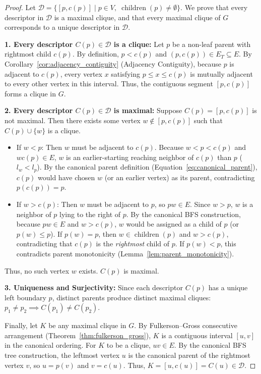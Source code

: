\begin{proof}
Let $\mathcal{D} = \{ [p, c(p)] \mid p \in V, \; \operatorname{children}(p) \ne \emptyset \}$. We prove that every descriptor in $\mathcal{D}$ is a maximal clique, and that every maximal clique of $G$ corresponds to a unique descriptor in $\mathcal{D}$.

\textbf{1. Every descriptor $C(p) \in \mathcal{D}$ is a clique:}
Let $p$ be a non-leaf parent with rightmost child $c(p)$. By definition, $p < c(p)$ and $(p, c(p)) \in E_T \subseteq E$. By Corollary~\ref{cor:adjacency_contiguity} (Adjacency Contiguity), because $p$ is adjacent to $c(p)$, every vertex $x$ satisfying $p \le x \le c(p)$ is mutually adjacent to every other vertex in this interval. Thus, the contiguous segment $[p, c(p)]$ forms a clique in $G$.

\textbf{2. Every descriptor $C(p) \in \mathcal{D}$ is maximal:}
Suppose $C(p) = [p, c(p)]$ is not maximal. Then there exists some vertex $w \notin [p, c(p)]$ such that $C(p) \cup \{w\}$ is a clique.
\begin{itemize}
    \item If $w < p$: Then $w$ must be adjacent to $c(p)$. Because $w < p < c(p)$ and $w c(p) \in E$, $w$ is an earlier-starting reaching neighbor of $c(p)$ than $p$ ($l_w < l_p$). By the canonical parent definition (Equation~\eqref{eq:canonical_parent}), $c(p)$ would have chosen $w$ (or an earlier vertex) as its parent, contradicting $p(c(p)) = p$.
    \item If $w > c(p)$: Then $w$ must be adjacent to $p$, so $pw \in E$. Since $w > p$, $w$ is a neighbor of $p$ lying to the right of $p$. By the canonical BFS construction, because $pw \in E$ and $w > c(p)$, $w$ would be assigned as a child of $p$ (or $p(w) \le p$). If $p(w) = p$, then $w \in \operatorname{children}(p)$ and $w > c(p)$, contradicting that $c(p)$ is the \emph{rightmost} child of $p$. If $p(w) < p$, this contradicts parent monotonicity (Lemma~\ref{lem:parent_monotonicity}).
\end{itemize}
Thus, no such vertex $w$ exists. $C(p)$ is maximal.

\textbf{3. Uniqueness and Surjectivity:}
Since each descriptor $C(p)$ has a unique left boundary $p$, distinct parents produce distinct maximal cliques: $p_1 \ne p_2 \implies C(p_1) \ne C(p_2)$. 

Finally, let $K$ be any maximal clique in $G$. By Fulkerson--Gross consecutive arrangement (Theorem~\ref{thm:fulkerson_gross}), $K$ is a contiguous interval $[u, v]$ in the canonical ordering. For $K$ to be a clique, $uv \in E$. By the canonical BFS tree construction, the leftmost vertex $u$ is the canonical parent of the rightmost vertex $v$, so $u = p(v)$ and $v = c(u)$. Thus, $K = [u, c(u)] = C(u) \in \mathcal{D}$.
\end{proof}

